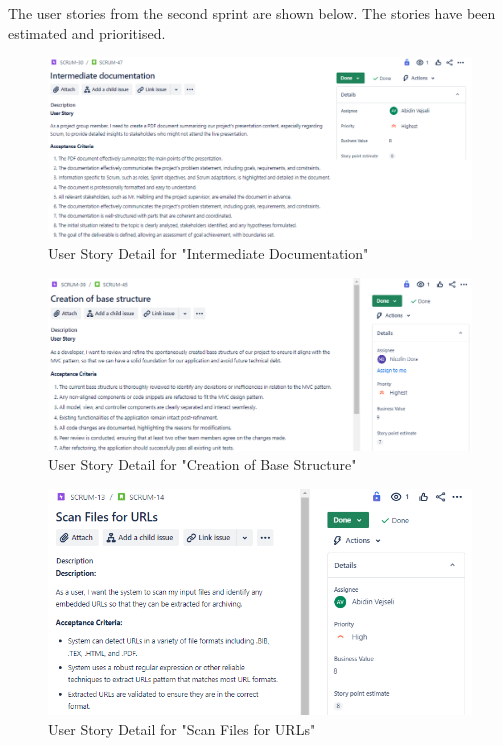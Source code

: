 The user stories from the second sprint are shown below. The stories have been estimated and prioritised.
\begin{figure}[h!]
    \centering
    \includegraphics[width=1\textwidth]{pictures/Scrum/Sprint 2/UserStory_13}
    \caption{User Story Detail for "Intermediate Documentation"}
    \label{fig:sprint_2_userstory_1}
\end{figure}
\begin{figure}[h!]
    \centering
    \includegraphics[width=1\textwidth]{pictures/Scrum/Sprint 2/UserStory_11}
    \caption{User Story Detail for "Creation of Base Structure"}
    \label{fig:sprint_2_userstory_2}
\end{figure}
\begin{figure}[h!]
    \centering
    \includegraphics[width=1\textwidth]{pictures/Scrum/Sprint 2/UserStory_5}
    \caption{User Story Detail for "Scan Files for URLs"}
    \label{fig:sprint_2_userstory_3}
\end{figure}
